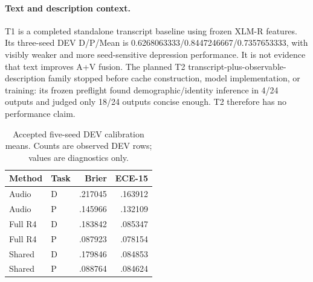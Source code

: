 \paragraph{Text and description context.}
T1 is a completed standalone transcript baseline using frozen XLM-R features. Its three-seed DEV D/P/Mean is 0.6268063333/0.8447246667/0.7357653333, with visibly weaker and more seed-sensitive depression performance. It is not evidence that text improves A+V fusion. The planned T2 transcript-plus-observable-description family stopped before cache construction, model implementation, or training: its frozen preflight found demographic/identity inference in 4/24 outputs and judged only 18/24 outputs concise enough. T2 therefore has no performance claim.

\begin{table}[t]
\centering\scriptsize
\caption{Accepted five-seed DEV calibration means. Counts are observed DEV rows; values are diagnostics only.}
\label{tab:calibration}
\begin{tabular}{llrr}
\toprule
Method & Task & Brier & ECE-15\\
\midrule
Audio & D & .217045 & .163912\\
Audio & P & .145966 & .132109\\
Full R4 & D & .183842 & .085347\\
Full R4 & P & .087923 & .078154\\
Shared & D & .179846 & .084853\\
Shared & P & .088764 & .084624\\
\bottomrule
\end{tabular}
\end{table}

